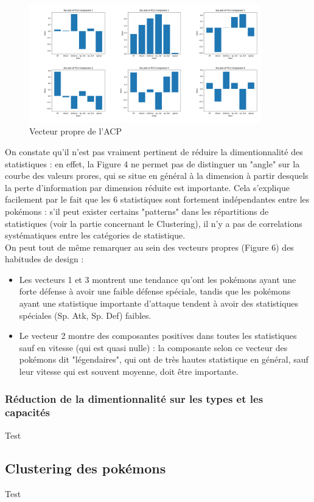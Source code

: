 \documentclass[a4paper,12pt]{article}
\begin{document}
\begin{figure}[htbp]
    \includegraphics[width=0.9\textwidth]{Image/eigen_vector_PCA.png}
    \caption{Vecteur propre de l'ACP}
\end{figure}

On constate qu'il n'est pas vraiment pertinent de réduire la dimentionnalité des
statistiques : en effet, la Figure 4 ne permet pas de distinguer un "angle" sur
la courbe des valeurs prores, qui se situe en général à la dimension à partir
desquels la perte d'information par dimension réduite est importante. Cela
s'explique facilement par le fait que les 6 statistiques sont fortement
indépendantes entre les pokémons : s'il peut exister certains "patterns" dans
les répartitions de statistiques (voir la partie concernant le Clustering), il
n'y a pas de correlations systématiques entre les catégories de statistique. \\
On peut tout de même remarquer au sein des vecteurs propres (Figure 6) des
habitudes de design :
\begin{itemize}
    \item Les vecteurs 1 et 3 montrent une tendance qu'ont les pokémons ayant
    une forte défense à avoir une faible défense spéciale, tandis que les
    pokémons ayant une statistique importante d'attaque tendent à avoir des
    statistiques spéciales (Sp. Atk, Sp. Def) faibles.
    \item Le vecteur 2 montre des composantes positives dans toutes les statistiques sauf en vitesse (qui est quasi nulle) : la composante selon ce vecteur des pokémons dit "légendaires", qui ont de très hautes statistique en général, sauf leur vitesse qui est souvent moyenne, doit être importante.
\end{itemize}
\subsubsection{Réduction de la dimentionnalité sur les types et les capacités}
Test
\subsection{Clustering des pokémons}
Test
\end{document}
